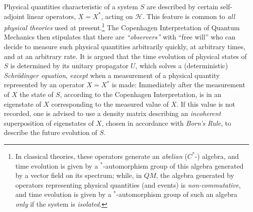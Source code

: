 \documentclass[a4paper,11pt]{article}
\begin{document}
Physical quantities characteristic of a system $S$ are described by certain self-adjoint linear operators, $X=X^{*}$, acting on $\mathcal{H}$. This feature is common to \textit{all physical theories} used at present.\footnote{In classical theories, these operators generate an \textit{abelian} ($C^{*}$-) algebra, and time evolution is given by a $^{*}$-automorphism group of this algebra generated by a vector field on its spectrum; while, in $QM$, the algebra generated by operators representing physical quantities (and events) is \textit{non-commutative}, and time evolution is given by a $^{*}$-automorphism group of such an algebra \textit{only} if the system is \textit{isolated}.} The Copenhagen Interpretation of Quantum Mechanics then stipulates that there are \textit{``observers''} with ``free will'' who can decide to measure such physical quantities arbitrarily quickly, at arbitrary times, and at an arbitrary rate. It is argued that the time evolution of physical states of $S$ is determined by its unitary propagator $U$, which solves a (deterministic) \textit{Schr\"{o}dinger equation}, \textit{except} when a measurement of a physical quantity represented by an operator $X=X^{*}$ is made: Immediately after the measurement of $X$ the state of $S$, according to the Copenhagen Interpretation, is in an eigenstate of $X$ corresponding to the measured value of $X$. If this value is not recorded, one is advised to use a density matrix describing an \textit{incoherent} superposition of eigenstates of $X$, chosen in accordance with \textit{Born's Rule}, to describe the future evolution of $S$. 
\end{document}
